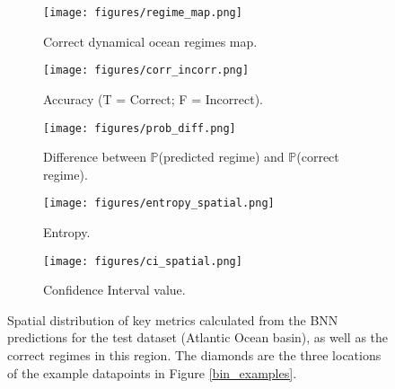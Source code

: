 \documentclass[a4paper]{article}
\begin{document}
\begin{figure}
\begin{center}
\begin{subfigure}{0.4
\textwidth}
\centering
    \texttt{[image: figures/regime\_map.png]}    \caption{Correct dynamical ocean regimes map.}
    \label{fig:regime_map}
    \end{subfigure}
\begin{subfigure}{0.4
\textwidth}
\centering
    \texttt{[image: figures/corr\_incorr.png]}
    \caption{Accuracy (T = Correct; F = Incorrect).}
    \label{fig:correct_map}
    \end{subfigure}
    \end{center}
        \begin{subfigure}{0.32
\textwidth}
    \centering
    \texttt{[image: figures/prob\_diff.png]}
    \caption{Difference between $\mathbb{P}$(predicted regime) and $\mathbb{P}$(correct regime).}
    \label{fig:probability_spatial}
    \end{subfigure}
    \hfill
\begin{subfigure}{0.32
\textwidth}
    \centering
    \texttt{[image: figures/entropy\_spatial.png]}
    \caption{Entropy.\\\hspace{2pt}}
    \label{fig:entropy_spatial}
    \end{subfigure}
    \hfill
    \begin{subfigure}{0.32
\textwidth}
    \centering
    \texttt{[image: figures/ci\_spatial.png]}
    \caption{Confidence Interval value.\\\hspace{2pt}}
    \label{fig:ci_spatial}
    \end{subfigure}
    \caption{Spatial distribution of key metrics calculated from the BNN predictions for the test dataset (Atlantic Ocean basin), as well as the correct regimes in this region. The diamonds are the three locations of the example datapoints in Figure \ref{bin_examples}.}\label{fig:spatial}
\end{figure}
\end{document}
